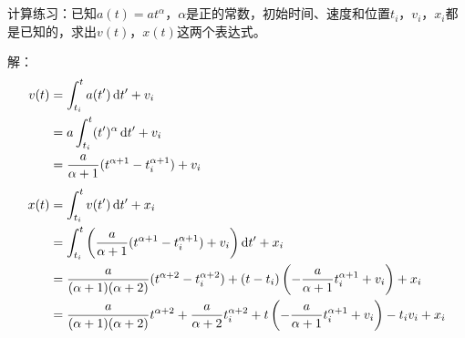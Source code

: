 \chapter[质点运动学与动力学基础]{}
\begin{solution}[质点运动学计算]
    计算练习：已知$a(t)=at^{\alpha }$，$\alpha$是正的常数，初始时间、速度和位置$t_{i}$，$v_{i}$，$x_{i}$都是已知的，求出$v(t)$，$x(t)$这两个表达式。

    \tcbrule

    解：
    \[
        \begin{aligned}
            v(t) & =\int_{t_{i}}^{t}a(t')\dif t'+v_{i}                                                                                                                     \\
                 & =a\int_{t_{i}}^{t}(t')^{\alpha}\dif t'+v_{i}                                                                                                            \\
                 & =\frac{a}{\alpha+1}(t^{\alpha+1}-t_{i}^{\alpha+1})+v_{i}                                                                                                \\[1ex]
            x(t) & =\int_{t_{i}}^{t}v(t')\dif t'+x_{i}                                                                                                                     \\
                 & =\int_{t_{i}}^{t}\left(\frac{a}{\alpha+1}(t^{\alpha+1}-t_{i}^{\alpha+1})+v_{i}\right)\dif t'+x_{i}                                                      \\
                 & =\frac{a}{(\alpha+1)(\alpha+2)}(t^{\alpha+2}-t_{i}^{\alpha+2})+(t-t_{i})\left(-\frac{a}{\alpha+1}t_{i}^{\alpha+1}+v_{i}\right)+x_{i}                    \\
                 & =\frac{a}{(\alpha+1)(\alpha+2)}t^{\alpha+2}+\frac{a}{\alpha+2}t_{i}^{\alpha+2}+t\left(-\frac{a}{\alpha+1}t_{i}^{\alpha+1}+v_{i}\right)-t_{i}v_{i}+x_{i}
        \end{aligned}
    \]

\end{solution}
